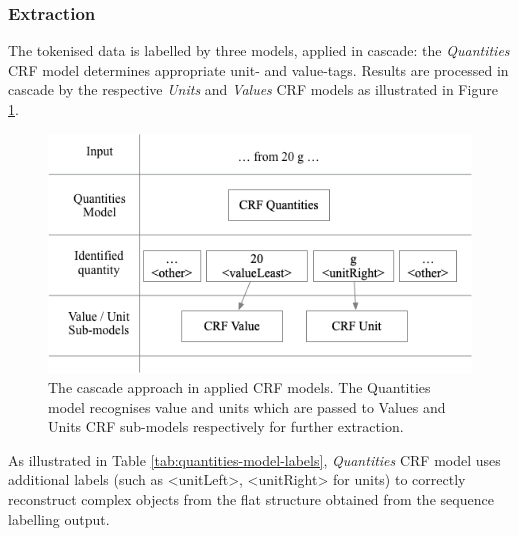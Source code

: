 \documentclass[sigconf]{acmart}
\begin{document}
\subsubsection{Extraction}
The tokenised data is labelled by three models, applied in cascade: the \textit{Quantities} CRF model determines appropriate unit- and value-tags. Results are processed in cascade by the respective \textit{Units} and \textit{Values} CRF models as illustrated in Figure \ref{fig:schema-cascade}.  

\begin{figure}[ht]
  \centering
  \includegraphics[width=\linewidth]{images/schema-cascade}
  \caption{The cascade approach in applied CRF models. The Quantities model recognises value and units which are  passed to Values and Units CRF sub-models respectively for further extraction.}
  \label{fig:schema-cascade}
\end{figure}

As illustrated in Table \ref{tab:quantities-model-labels}, \textit{Quantities} CRF model uses additional labels (such as <unitLeft>, <unitRight> for units) to correctly reconstruct complex objects from the flat structure obtained from the sequence labelling output.
\end{document}

